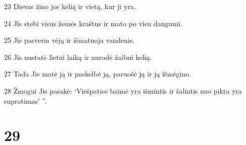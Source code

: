 \par 23 Dievas žino jos kelią ir vietą, kur ji yra. 
\par 24 Jis stebi visus žemės kraštus ir mato po visu dangumi. 
\par 25 Jis pasveria vėją ir išmatuoja vandenis. 
\par 26 Jis nustatė lietui laiką ir nurodė žaibui kelią. 
\par 27 Tada Jis matė ją ir paskelbė ją, paruošė ją ir ją išmėgino. 
\par 28 Žmogui Jis pasakė: ‘Viešpaties baimė yra išmintis ir šalintis nuo pikta yra supratimas’ ”.



\chapter{29}


